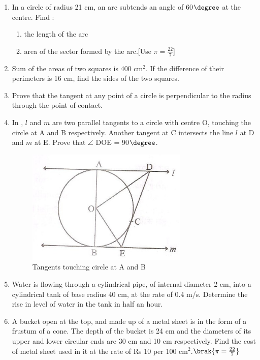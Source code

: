 \begin{enumerate}
\item In a circle of radius 21 cm, an arc subtends an angle of 60$\degree$ at the centre. Find :  \begin{enumerate} 
\item the length of the arc
\item area of the sector formed by the arc.[Use $\pi = \frac{22}{7}$]
\end{enumerate}
\item Sum of the areas of two squares is 400 cm$^2$. If the difference of their perimeters is 16 cm, find the sides of the two squares.

\item Prove that the tangent at any point of a circle is perpendicular to the radius through the point of contact.


\item In , $l$ and $m$ are two parallel tangents to a circle with centre O, touching the circle at A and B respectively. Another tangent at C intersects the line $l$ at D and $m$ at E. Prove that $\angle$ DOE = 90$\degree$.
\begin{figure}[H]
\centering
\includegraphics[width=\columnwidth]{figs/5.png}
\caption{Tangents touching circle at A and B}
\label{fig:fig5}
 \end{figure}

 \item Water is flowing through a cylindrical pipe, of internal diameter 2 cm, into a cylindrical tank of base radius 40 cm, at the rate of 0.4 m/s. Determine the rise in level of water in the tank in half an hour.
\item A bucket open at the top, and made up of a metal sheet is in the form of a frustum of a cone. The depth of the bucket is 24 cm and the diameters of its upper and lower circular ends are 30 cm and 10 cm respectively. Find the cost of metal sheet used in it at the rate of Rs 10 per 100 cm$^2$.$\brak{ \pi = \frac{22}{7}}$

\end{enumerate}
